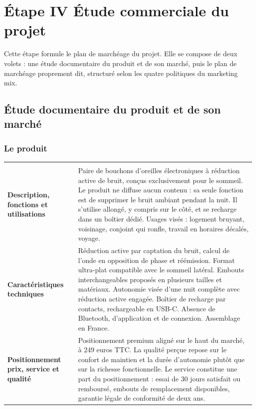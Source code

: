 \clearpage
\section{Étape IV \textendash{} Étude commerciale du projet}

Cette étape formule le plan de marchéage du projet. Elle se compose de deux
volets : une étude documentaire du produit et de son marché, puis le plan de
marchéage proprement dit, structuré selon les quatre politiques du marketing
mix.

\subsection{Étude documentaire du produit et de son marché}

\subsubsection{Le produit}

\begin{center}
\begin{xltabular}{\textwidth}{P{4cm}L}
\toprule
{} &  \\
\midrule
\endfirsthead
\toprule
{} &  \\
\midrule
\endhead

\textbf{Description, fonctions et utilisations}
&
Paire de bouchons d'oreilles électroniques à réduction active de bruit, conçus
exclusivement pour le sommeil. Le produit ne diffuse aucun contenu : sa seule
fonction est de supprimer le bruit ambiant pendant la nuit. Il s'utilise
allongé, y compris sur le côté, et se recharge dans un boîtier dédié. Usages
visés : logement bruyant, voisinage, conjoint qui ronfle, travail en horaires
décalés, voyage. \\

\textbf{Caractéristiques techniques}
&
Réduction active par captation du bruit, calcul de l'onde en opposition de phase
et réémission. Format ultra-plat compatible avec le sommeil latéral. Embouts
interchangeables proposés en plusieurs tailles et matériaux. Autonomie visée
d'une nuit complète avec réduction active engagée. Boîtier de recharge par
contacts, rechargeable en USB-C. Absence de Bluetooth, d'application et de
connexion. Assemblage en France. \\

\textbf{Positionnement prix, service et qualité}
&
Positionnement premium aligné sur le haut du marché, à 249 euros TTC. La qualité
perçue repose sur le confort de maintien et la durée d'autonomie plutôt que sur
la richesse fonctionnelle. Le service constitue une part du positionnement :
essai de 30 jours satisfait ou remboursé, embouts de remplacement disponibles,
garantie légale de conformité de deux ans. \\
\bottomrule
\end{xltabular}
\end{center}

